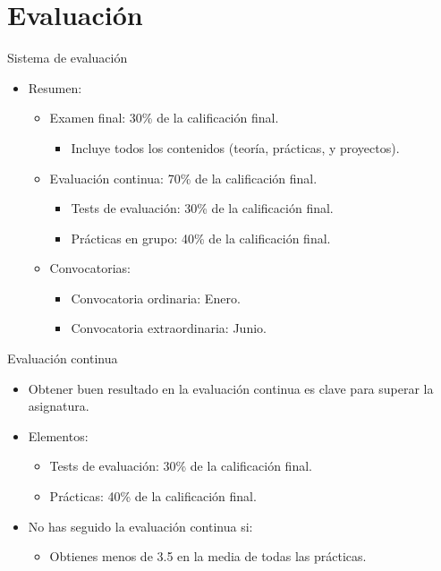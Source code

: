 \section{Evaluación}

\begin{frame}[t]{Sistema de evaluación}
\begin{itemize}
  \item Resumen:
  \vspace{1em}
    \begin{itemize}
      \item Examen final: 30\% de la calificación final.
        \begin{itemize}
          \item Incluye todos los contenidos (teoría, prácticas, y proyectos).
        \end{itemize}

      \item Evaluación continua: 70\% de la calificación final.
        \begin{itemize}
          \item Tests de evaluación: 30\% de la calificación final.
          \item Prácticas en grupo: 40\% de la calificación final.
        \end{itemize}
    \end{itemize}
  \vspace{1em}
  \begin{itemize}
    \item Convocatorias:
      \begin{itemize}
        \item Convocatoria ordinaria: Enero.
        \item Convocatoria extraordinaria: Junio.
      \end{itemize}
  \end{itemize}
\end{itemize}
\end{frame}

\begin{frame}[t]{Evaluación continua}
\begin{itemize}
  \item Obtener buen resultado en la evaluación continua es clave para superar la asignatura.
  \item Elementos:
    \begin{itemize}
      \item Tests de evaluación: 30\% de la calificación final.
      \item Prácticas: 40\% de la calificación final.
    \end{itemize}
  \vspace{1em}
  \item No has seguido la evaluación continua si:
    \begin{itemize}
      \item Obtienes menos de 3.5 en la media de todas las prácticas.
    \end{itemize}
\end{itemize}
\end{frame}

